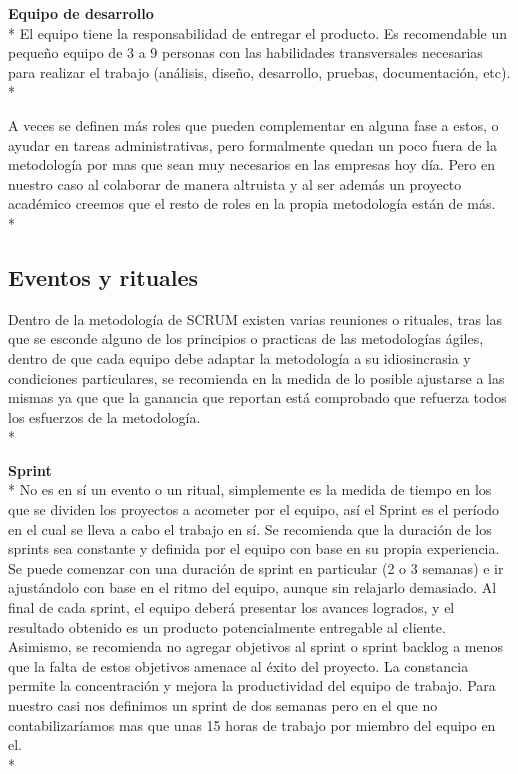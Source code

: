 \documentclass[../pfc.tex]{subfiles}
\begin{document}
	\textbf{Equipo de desarrollo}\\*
	El equipo tiene la responsabilidad de entregar el producto. Es recomendable un pequeño equipo de 3 a 9 personas con las habilidades transversales necesarias para realizar el trabajo (análisis, diseño, desarrollo, pruebas, documentación, etc).\\*
	
	A veces se definen más roles que pueden complementar en alguna fase a estos, o ayudar en tareas administrativas, pero formalmente quedan un poco fuera de la metodología por mas que sean muy necesarios en las empresas hoy día. Pero en nuestro caso al colaborar de manera altruista y al ser además un proyecto académico creemos que el resto de roles  en la propia metodología están de más.\\*
	
	\subsection{Eventos y rituales}
	
	Dentro de la metodología de SCRUM existen varias reuniones o rituales, tras las que se esconde alguno de los principios o practicas de las metodologías ágiles\cite{agile}, dentro de que cada equipo debe adaptar la metodología a su idiosincrasia y condiciones particulares, se recomienda en la medida de lo posible ajustarse a las mismas ya que que la ganancia que reportan está comprobado que refuerza todos los esfuerzos de la metodología.\\* 
		
	\textbf{Sprint}\\* 
	No es en sí un evento o un ritual, simplemente es la medida de tiempo en los que se dividen los proyectos a acometer por el equipo, así el Sprint es el período en el cual se lleva a cabo el trabajo en sí. Se recomienda que la duración de los sprints sea constante y definida por el equipo con base en su propia experiencia. Se puede comenzar con una duración de sprint en particular (2 o 3 semanas) e ir ajustándolo con base en el ritmo del equipo, aunque sin relajarlo demasiado. Al final de cada sprint, el equipo deberá presentar los avances logrados, y el resultado obtenido es un producto potencialmente entregable al cliente. Asimismo, se recomienda no agregar objetivos al sprint o sprint backlog a menos que la falta de estos objetivos amenace al éxito del proyecto. La constancia permite la concentración y mejora la productividad del equipo de trabajo. Para nuestro casi nos definimos un sprint de dos semanas pero en el que no contabilizaríamos mas que unas 15 horas de trabajo por miembro del equipo en el. \\*
	
\end{document}
